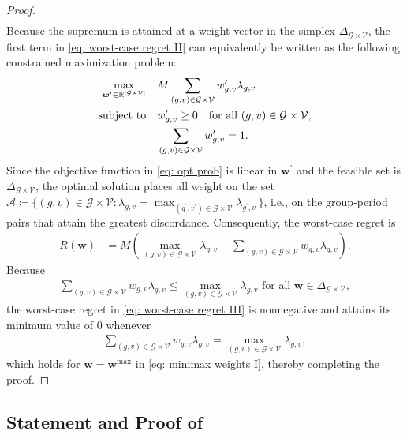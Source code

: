 \documentclass[twoside,11pt]{article}
\begin{document}
\begin{proof}
\begin{align*}
\end{align*}
Because the supremum is attained at a weight vector in the simplex $\Delta_{\mathcal{G} \times \mathcal{V}}$, the first term in \eqref{eq: worst-case regret II} can equivalently be written as the following constrained maximization problem:
\begin{align}
\max_{\bm{w}^{\prime} \in \operatorname{\mathbb{R}}^{\lvert\mathcal{G} \times \mathcal{V}\rvert}} 
& \quad M \sum_{(g,v) \in \mathcal{G} \times \mathcal{V}} w^{\prime}_{g,v} \lambda_{g,v} \label{eq: opt prob}\\
\text{subject to} 
& \quad w^{\prime}_{g,v} \geq 0 \quad \text{for all } (g,v) \in \mathcal{G} \times \mathcal{V}, \notag \\
& \quad \sum_{(g,v) \in \mathcal{G} \times \mathcal{V}} w^{\prime}_{g,v} = 1. \notag
\end{align}
Since the objective function in \eqref{eq: opt prob} is linear in $\bm{w}^{\prime}$ and the feasible set is $\Delta_{\mathcal{G} \times \mathcal{V}}$, the optimal solution places all weight on the set $\mathcal{A} \coloneqq \{(g, v) \in \mathcal{G} \times \mathcal{V}: \lambda_{g,v} = \max_{(g^{\prime}, v^{\prime}) \in \mathcal{G} \times \mathcal{V}} \lambda_{g^{\prime}, v^{\prime}}\}$, i.e., on the group-period pairs that attain the greatest discordance. Consequently, the worst-case regret is
\begin{align} \label{eq: worst-case regret III}
R(\bm{w}) & = M \left(\max_{(g,v) \in \mathcal{G} \times \mathcal{V}} \lambda_{g,v} - \sum_{(g,v) \in \mathcal{G} \times \mathcal{V}} w_{g,v} \lambda_{g,v}\right).
\end{align}
Because
\begin{align*}
\sum_{(g,v) \in \mathcal{G} \times \mathcal{V}} w_{g,v} \lambda_{g,v} \leq \max_{(g,v)\in \mathcal{G} \times \mathcal{V}} \lambda_{g,v} \text{ for all } \bm{w} \in \Delta_{\mathcal{G}\times\mathcal{V}},
\end{align*}
the worst-case regret in \eqref{eq: worst-case regret III} is nonnegative and attains its minimum value of $0$ whenever
\begin{align*}
\sum_{(g,v) \in \mathcal{G} \times \mathcal{V}} w_{g,v}\lambda_{g,v} = \max_{(g,v) \in \mathcal{G} \times \mathcal{V}} \lambda_{g,v},
\end{align*}
which holds for $\bm{w} = \bm{w}^{\mathrm{max}}$ in \eqref{eq: minimax weights I}, thereby completing the proof.
\end{proof}

\subsection*{Statement and Proof of }
\end{document}

